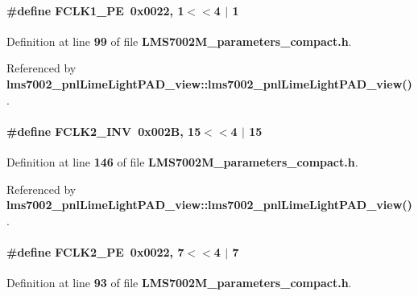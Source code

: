 \paragraph[{F\+C\+L\+K1\+\_\+\+PE}]{\setlength{\rightskip}{0pt plus 5cm}\#define F\+C\+L\+K1\+\_\+\+PE~0x0022, 1$<$$<$4 $\vert$  1}\label{LMS7002M__parameters__compact_8h_ae4936d1bf481344579cec082677eac8f}


Definition at line {\bf 99} of file {\bf L\+M\+S7002\+M\+\_\+parameters\+\_\+compact.\+h}.



Referenced by {\bf lms7002\+\_\+pnl\+Lime\+Light\+P\+A\+D\+\_\+view\+::lms7002\+\_\+pnl\+Lime\+Light\+P\+A\+D\+\_\+view()}.

\paragraph[{F\+C\+L\+K2\+\_\+\+I\+NV}]{\setlength{\rightskip}{0pt plus 5cm}\#define F\+C\+L\+K2\+\_\+\+I\+NV~0x002\+B, 15$<$$<$4 $\vert$  15}\label{LMS7002M__parameters__compact_8h_ae51dfcdfebed2bc0e2303a857e916d43}


Definition at line {\bf 146} of file {\bf L\+M\+S7002\+M\+\_\+parameters\+\_\+compact.\+h}.



Referenced by {\bf lms7002\+\_\+pnl\+Lime\+Light\+P\+A\+D\+\_\+view\+::lms7002\+\_\+pnl\+Lime\+Light\+P\+A\+D\+\_\+view()}.

\paragraph[{F\+C\+L\+K2\+\_\+\+PE}]{\setlength{\rightskip}{0pt plus 5cm}\#define F\+C\+L\+K2\+\_\+\+PE~0x0022, 7$<$$<$4 $\vert$  7}\label{LMS7002M__parameters__compact_8h_a3f55457dddb9afb2ccdf31ec880b6c02}


Definition at line {\bf 93} of file {\bf L\+M\+S7002\+M\+\_\+parameters\+\_\+compact.\+h}.



